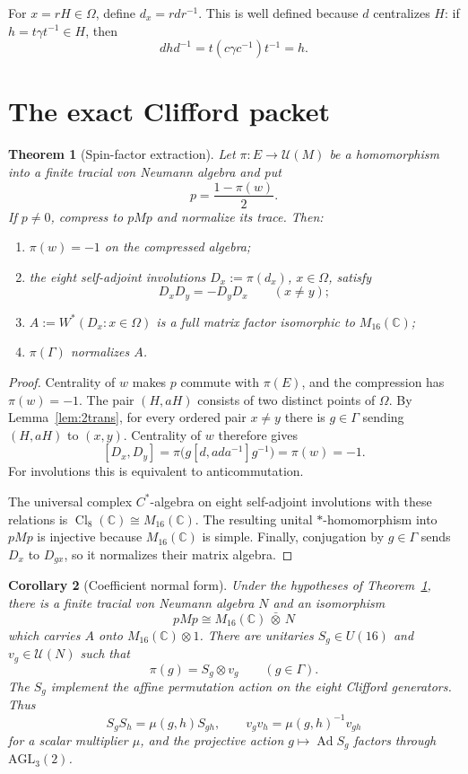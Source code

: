 \documentclass[11pt]{article}
\newtheorem{theorem}{Theorem}[section]
\newtheorem{corollary}[theorem]{Corollary}
\theoremstyle{definition}
\theoremstyle{remark}
\newcommand{\C}{\mathbb C}
\newcommand{\U}{\mathcal U}
\newcommand{\Ad}{\operatorname{Ad}}
\newcommand{\Cl}{\operatorname{Cl}}
\begin{document}
For $x=rH\in\Omega$, define $d_x=rdr^{-1}$.  This is well defined because
$d$ centralizes $H$: if $h=t\gamma t^{-1}\in H$, then
\[
 d h d^{-1}=t(c\gamma c^{-1})t^{-1}=h.
\]

\section{The exact Clifford packet}

\begin{theorem}[Spin-factor extraction]\label{thm:spin}
Let $\pi:E\to\U(M)$ be a homomorphism into a finite tracial von Neumann
algebra and put
\[
 p=\frac{1-\pi(w)}2.
\]
If $p\ne0$, compress to $pMp$ and normalize its trace.  Then:
\begin{enumerate}
\item $\pi(w)=-1$ on the compressed algebra;
\item the eight self-adjoint involutions
      $D_x:=\pi(d_x)$, $x\in\Omega$, satisfy
      \[
       D_xD_y=-D_yD_x\qquad(x\ne y);
      \]
\item $A:=W^*(D_x:x\in\Omega)$ is a full matrix factor
      isomorphic to $M_{16}(\C)$;
\item $\pi(\Gamma)$ normalizes $A$.
\end{enumerate}
\end{theorem}

\begin{proof}
Centrality of $w$ makes $p$ commute with $\pi(E)$, and the compression has
$\pi(w)=-1$.  The pair $(H,aH)$ consists of two distinct points of
$\Omega$.  By Lemma~\ref{lem:2trans}, for every ordered pair $x\ne y$
there is $g\in\Gamma$ sending $(H,aH)$ to $(x,y)$.  Centrality of $w$
therefore gives
\[
 [D_x,D_y]
 =\pi\bigl(g[d,ada^{-1}]g^{-1}\bigr)
 =\pi(w)=-1.
\]
For involutions this is equivalent to anticommutation.

The universal complex $C^*$-algebra on eight self-adjoint involutions with
these relations is $\Cl_8(\C)\cong M_{16}(\C)$.  The resulting unital
$*$-homomorphism into $pMp$ is injective because $M_{16}(\C)$ is simple.
Finally, conjugation by $g\in\Gamma$ sends $D_x$ to $D_{gx}$, so it
normalizes their matrix algebra.
\end{proof}

\begin{corollary}[Coefficient normal form]\label{cor:normal}
Under the hypotheses of Theorem~\ref{thm:spin}, there is a finite tracial
von Neumann algebra $N$ and an isomorphism
\[
 pMp\cong M_{16}(\C)\,\bar\otimes\,N
\]
which carries $A$ onto $M_{16}(\C)\otimes1$.  There are unitaries
$S_g\in U(16)$ and $v_g\in\U(N)$ such that
\[
 \pi(g)=S_g\otimes v_g\qquad(g\in\Gamma).
\]
The $S_g$ implement the affine permutation action on the eight Clifford
generators.  Thus
\[
 S_gS_h=\mu(g,h)S_{gh},\qquad
 v_gv_h=\mu(g,h)^{-1}v_{gh}
\]
for a scalar multiplier $\mu$, and the projective action
$g\mapsto\Ad S_g$ factors through $\mathrm{AGL}_3(2)$.
\end{corollary}
\end{document}
